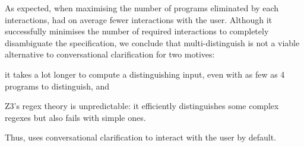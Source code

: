 As expected, when maximising the number of programs eliminated by each interactions, \Forest had on average fewer interactions with the user.
Although it successfully minimises the number of required interactions to completely disambiguate the specification, we conclude that multi-distinguish is not a viable alternative to conversational clarification for two motives:
\begin{enumerate*}[label=(\roman*)]
    \item it takes a lot longer to compute a distinguishing input, even with as few as 4 programs to distinguish, and
    \item Z3's regex theory is unpredictable: it efficiently distinguishes some complex regexes but also fails with simple ones.
\end{enumerate*}
Thus, \Forest uses conversational clarification to interact with the user by default.
